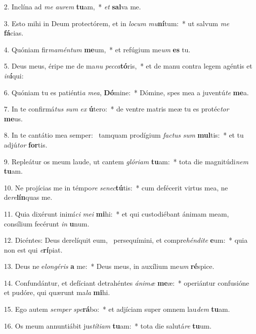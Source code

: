 2. Inclína ad \textit{me} \textit{au}\textit{rem} \textbf{tu}am,~*  \textit{et} \textbf{sal}va me.\

3. Esto mihi in Deum protectórem, et in \textit{lo}\textit{cum} \textit{mu}\textbf{ní}tum:~*  ut salvum \textit{me} \textbf{fá}cias.\

4. Quóniam fir\textit{ma}\textit{mén}\textit{tum} \textbf{me}um,~*  et refúgium me\textit{um} \textbf{es} tu.\

5. Deus meus, éripe me de ma\textit{nu} \textit{pec}\textit{ca}\textbf{tó}ris,~*  et de manu contra legem agéntis et \textit{in}\textbf{í}qui:\

6. Quóniam tu es patiénti\textit{a} \textit{me}\textit{a}, \textbf{Dó}mine:~*  Dómine, spes mea a juventú\textit{te} \textbf{me}a.\

7. In te confirmá\textit{tus} \textit{sum} \textit{ex} \textbf{ú}tero:~*  de ventre matris meæ tu es protéc\textit{tor} \textbf{me}us.\

8. In te cantátio mea semper: \dag\  tamquam prodígium \textit{fac}\textit{tus} \textit{sum} \textbf{mul}tis:~*  et tu adjú\textit{tor} \textbf{for}tis.\

9. Repleátur os meum laude, ut cantem \textit{gló}\textit{ri}\textit{am} \textbf{tu}am:~*  tota die magnitúdi\textit{nem} \textbf{tu}am.\

10. Ne projícias me in témpo\textit{re} \textit{se}\textit{nec}\textbf{tú}tis:~*  cum defécerit virtus mea, ne de\textit{re}\textbf{lín}quas me.\

11. Quia dixérunt inimí\textit{ci} \textit{me}\textit{i} \textbf{mi}hi:~*  et qui custodiébant ánimam meam, consílium fecérunt \textit{in} \textbf{u}num.\

12. Dicéntes: Deus derelíquit eum, \dag\  persequímini, et compre\textit{hén}\textit{di}\textit{te} \textbf{e}um:~*  quia non est qui \textit{e}\textbf{rí}piat.\

13. Deus ne e\textit{lon}\textit{gé}\textit{ris} \textbf{a} me:~*  Deus meus, in auxílium me\textit{um} \textbf{ré}spice.\

14. Confundántur, et defíciant detrahéntes \textit{á}\textit{ni}\textit{mæ} \textbf{me}æ:~*  operiántur confusióne et pudóre, qui quærunt ma\textit{la} \textbf{mi}hi.\

15. Ego autem \textit{sem}\textit{per} \textit{spe}\textbf{rá}bo:~*  et adjíciam super omnem lau\textit{dem} \textbf{tu}am.\

16. Os meum annuntiábit jus\textit{tí}\textit{ti}\textit{am} \textbf{tu}am:~*  tota die salutá\textit{re} \textbf{tu}um.\

